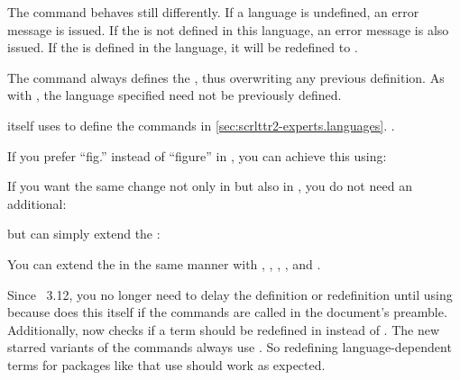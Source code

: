 The  command behaves still differently. If a language
is undefined, an error message is issued. If the  is not defined
in this language, an error message is also issued. If the  is
defined in the language, it will be redefined to .

The  command always
defines the , thus overwriting any previous definition. As with
, the language specified need not be previously
defined.

\KOMAScript{} itself uses  to define the commands in
\autoref{sec:scrlttr2-experts.languages}.
.

\begin{Example}
  If you prefer ``fig.'' instead of ``figure'' in , you can
  achieve this using:
\begin{lstcode}
\end{lstcode}
  If you want the same change not only in  but also in
  , you do not need an additional:
\begin{lstcode}
\end{lstcode}
  but can simply extend the :
\begin{lstcode}
\end{lstcode}
  You can extend the  in the same manner with
  , , , ,
  and .
\end{Example}

Since \KOMAScript~3.12, you no longer need
to delay the definition or redefinition until
 using  because
 does this itself if the commands are called in the
document's preamble. Additionally,  now checks if a term
should be redefined in  instead of
. The new starred variants of the commands
always use . So redefining language-dependent
terms for packages like  that use
 should work as expected.

